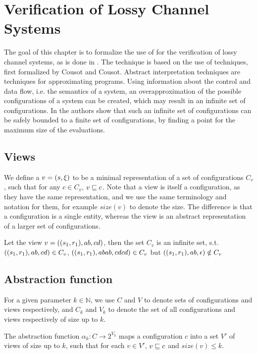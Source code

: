 \newpage
\section{Verification of Lossy Channel Systems}
\label{model}
The goal of this chapter is to formalize the use of  for the verification of lossy channel systems, as is done in \cite{parosh}. The technique is based on the use of  techniques, first formalized by Cousot and Cousot\cite{cousot1977}. Abstract interpretation techniques are techniques for approximating programs. Using information about the control and data flow, i.e. the semantics of a system, an overapproximation of the possible configurations of a system can be created, which may result in an infinite set of configurations. In \cite{parosh} the authors show that such an infinite set of configurations can be safely bounded to a finite set of configurations, by finding a  point for the maximum size of the evaluations.


\subsection{Views}
\label{subwords}
We define a  $v= (s, \xi)$ to be a minimal representation of a set of configurations $C_v$, such that for any $c \in C_v$, $v \sqsubseteq c$. Note that a view is itself a configuration, as they have the same representation, and we use the same terminology and notation for them, for example $size(v)$ to denote the size. The difference is that a configuration is a single entity, whereas the view is an abstract representation of a larger set of configurations.

\begin{exmp}
Let the view $v = ((s_1, r_1), ab, cd)$, then the set $C_v$ is an infinite set, s.t. $((s_1, r_1), ab, cd) \in C_v$, $((s_1, r_1), abab, cdcd) \in C_v$ but $((s_1, r_1), ab, \epsilon) \notin C_v$
\end{exmp}

\subsection{Abstraction function}
\label{alphagamma}
For a given parameter $k \in \mathbb{N}$, we use $C$ and $V$ to denote sets of configurations and views respectively, and $C_k$ and $V_k$ to denote the set of all configurations and views respectively of size up to $k$.

The abstraction function $\alpha_k: C\rightarrow 2^{V_k}$ maps a configuration $c$ into a set $V'$ of views of size up to $k$, such that for each $v\in V'$, $v \sqsubseteq c$ and $size(v) \leq k$.

